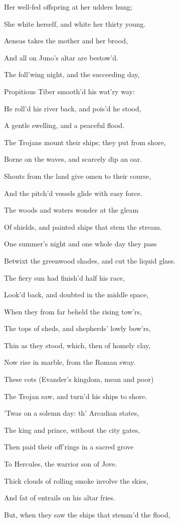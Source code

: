 Her well-fed offspring at her udders hung;

She white herself, and white her thirty young.

Aeneas takes the mother and her brood,

And all on Juno’s altar are bestow’d.

The foll’wing night, and the succeeding day,

Propitious Tiber smooth’d his wat’ry way:

He roll’d his river back, and pois’d he stood,

A gentle swelling, and a peaceful flood.

The Trojans mount their ships; they put from shore,

Borne on the waves, and scarcely dip an oar.

Shouts from the land give omen to their course,

And the pitch’d vessels glide with easy force.

The woods and waters wonder at the gleam

Of shields, and painted ships that stem the stream.

One summer’s night and one whole day they pass

Betwixt the greenwood shades, and cut the liquid glass.

The fiery sun had finish’d half his race,

Look’d back, and doubted in the middle space,

When they from far beheld the rising tow’rs,

The tops of sheds, and shepherds’ lowly bow’rs,

Thin as they stood, which, then of homely clay,

Now rise in marble, from the Roman sway.

These cots (Evander’s kingdom, mean and poor)

The Trojan saw, and turn’d his ships to shore.

’Twas on a solemn day: th’ Arcadian states,

The king and prince, without the city gates,

Then paid their off’rings in a sacred grove

To Hercules, the warrior son of Jove.

Thick clouds of rolling smoke involve the skies,

And fat of entrails on his altar fries.

But, when they saw the ships that stemm’d the flood,

